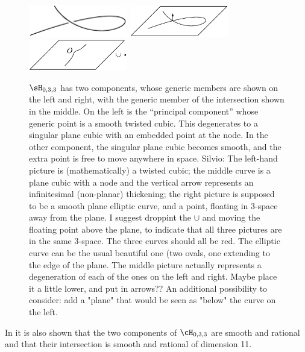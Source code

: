 \begin{figure}
\centerline {%
\includegraphics[width=1.7in]{"main/Fig18-1A"}\quad
\includegraphics[width=1.7in]{"main/Fig18-1B"}%
\includegraphics[width=1.7in]{"main/Fig18-1C"}%
}
\caption{$\sH_{0,3,3}$ has two components, whose generic members are shown on the left and right,
with the generic member of the intersection shown in the middle. On the left is the ``principal component'' whose generic point is a smooth twisted cubic. This degenerates to a singular plane
cubic with an embedded point at the node. In the other component, the singular plane cubic
becomes smooth, and the extra point is free to move anywhere in space.
{Silvio: The left-hand picture is (mathematically) a twisted cubic; the middle curve is a plane cubic with a node
and the vertical arrow represents an infinitesimal (non-planar) thickening; the right picture is supposed to be a smooth
plane elliptic curve, and a point, floating in 3-space away from the plane.
I suggest droppint the $\cup$ and moving the floating point above the plane, to indicate that all three pictures are in the same
3-space. The three curves should all be red. The elliptic curve can be the usual beautiful one (two ovals, one extending
to the edge of the plane. 
The middle picture actually represents a degeneration of each of the ones on the left and right. Maybe place it a little lower, and put in arrows??
An additional possibility to consider: add a "plane" that would be seen as "below" the curve on the left. }}
\label{Fig18.1}
\end{figure}


\begin{fact}
In \cite{Piene-Schlessinger} it is also shown that the two components of $\cH_{0,3,3}$ are smooth and rational and that
their  intersection is  smooth and rational of dimension 11.
\end{fact}

